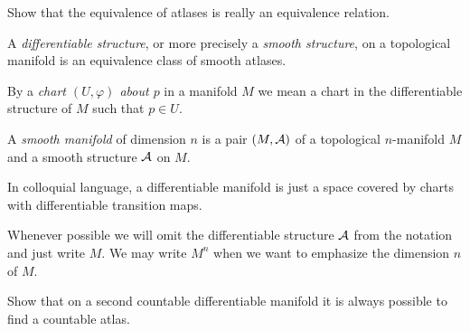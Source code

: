 \begin{exercise}
  Show that the equivalence of atlases is really an equivalence relation.
\end{exercise}

\begin{definition}\label{def:diffstr}
  A \emph{differentiable structure}, or more precisely a \emph{smooth structure}, on a topological manifold is an equivalence class of smooth atlases.
\end{definition}

\begin{notation}
By a \emph{chart $(U, \varphi)$ about $p$} in a manifold $M$ we mean a chart in the differentiable structure of $M$ such that $p\in U$.
\end{notation}

\begin{definition}\label{def:diffmanifold}
  A \emph{smooth manifold} of dimension $n$ is a pair $(M, \mathcal{A})$ of a topological $n$-manifold $M$ and a smooth structure $\mathcal{A}$ on $M$.
\end{definition}

In colloquial language, a differentiable manifold is just a space covered by charts with differentiable transition maps.

\begin{notation}
  Whenever possible we will omit the differentiable structure $\mathcal{A}$ from the notation and just write $M$.
  We may write $M^n$ when we want to emphasize the dimension $n$ of $M$.
\end{notation}

\begin{exercise}
  Show that on a second countable differentiable manifold it is always possible to find a countable atlas.
\end{exercise}

